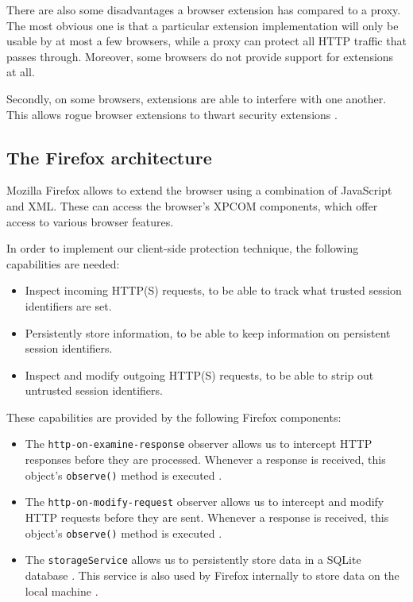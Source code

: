 There are also some disadvantages a browser extension has compared to a proxy. The most obvious one is that a particular extension implementation will only be usable by at most a few browsers, while a proxy can protect all HTTP traffic that passes through. Moreover, some browsers do not provide support for extensions at all.

Secondly, on some browsers, extensions are able to interfere with one another. This allows rogue browser extensions to thwart security extensions \cite{Barth2010}.

\subsection{The Firefox architecture}

Mozilla Firefox allows to extend the browser using a combination of JavaScript and XML. These can access the browser's XPCOM components, which offer access to various browser features.

In order to implement our client-side protection technique, the following capabilities are needed:
\begin{itemize}
	\item Inspect incoming HTTP(S) requests, to be able to track what trusted session identifiers are set.
	\item Persistently store information, to be able to keep information on persistent session identifiers.
	\item Inspect and modify outgoing HTTP(S) requests, to be able to strip out untrusted session identifiers.
\end{itemize}
These capabilities are provided by the following Firefox components:
\begin{itemize}
	\item The \texttt{http-on-examine-response} observer allows us to intercept HTTP responses before they are processed. Whenever a response is received, this object's \texttt{observe()} method is executed \cite{MozillaObservers}.
	\item The \texttt{http-on-modify-request} observer allows us to intercept and modify HTTP requests before they are sent. Whenever a response is received, this object's \texttt{observe()} method is executed \cite{MozillaObservers}.
	\item The \texttt{storageService} allows us to persistently store data in a SQLite database \cite{MozillaStorage}. This service is also used by Firefox internally to store data on the local machine \cite{Bonne2011}.
\end{itemize}

